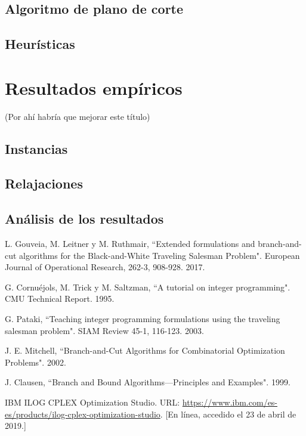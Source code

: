 \documentclass[10pt, a4paper]{article}
\theoremstyle{definition}
\begin{document}
\subsection{Algoritmo de plano de corte}

\subsection{Heurísticas}

\section{Resultados empíricos}

(Por ahí habría que mejorar este título)

\subsection{Instancias}

\subsection{Relajaciones}

\subsection{Análisis de los resultados}

\pagebreak

\begin{thebibliography}{9}

L. Gouveia, M. Leitner y M. Ruthmair, “Extended formulations and branch-and-cut algorithms for the Black-and-White Traveling Salesman Problem". European Journal of Operational Research, 262-3, 908-928. 2017.

G. Cornuéjols, M. Trick y M. Saltzman, “A tutorial on integer programming". CMU Technical Report. 1995.

G. Pataki, “Teaching integer programming formulations using the traveling salesman problem". SIAM Review 45-1, 116-123. 2003.

J. E. Mitchell, “Branch-and-Cut Algorithms for Combinatorial Optimization Problems". 2002.

J. Clausen, “Branch and Bound Algorithms—Principles and Examples". 1999.

IBM ILOG CPLEX Optimization Studio. URL: \url{https://www.ibm.com/es-es/products/ilog-cplex-optimization-studio}. [En línea, accedido el 23 de abril de 2019.]

\end{thebibliography}
\end{document}
